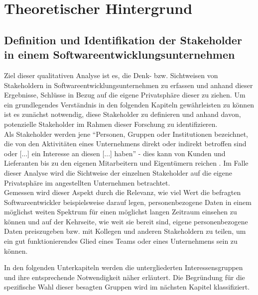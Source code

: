 \chapter{Theoretischer Hintergrund} %
\label{Background} %

\section{Definition und Identifikation der Stakeholder in einem Softwareentwicklungsunternehmen}
Ziel dieser qualitativen Analyse ist es, die Denk- bzw. Sichtweisen von Stakeholdern in Softwareentwicklungsunternehmen zu erfassen und anhand dieser Ergebnisse, Schlüsse in Bezug auf die
eigene Privatsphäre dieser zu ziehen. Um ein grundlegendes Verständnis in den folgenden Kapiteln gewährleisten zu können ist es zunächst notwendig, diese Stakeholder zu definieren und anhand davon, 
potenzielle Stakeholder im Rahmen dieser Forschung zu identifizieren. \\ Als Stakeholder werden jene \enquote{Personen, Gruppen oder Institutionen bezeichnet, die von den Aktivitäten eines Unternehmens 
direkt oder indirekt betroffen sind oder [...] ein Interesse an diesen [...] haben} \cite{Fle:16} - dies kann von Kunden und Lieferanten bis zu den eigenen Mitarbeitern und Eigentümern reichen \cite{Fle:16}. 
Im Falle dieser Analyse wird die Sichtweise der einzelnen Stakeholder auf die eigene Privatsphäre im angestellten Unternehmen betrachtet. \\ Gemessen wird dieser Aspekt durch die Relevanz, wie viel Wert die befragten
Softwareentwickler beispielsweise darauf legen, personenbezogene Daten in einem möglichst weiten Spektrum für einen möglichst langen Zeitraum einsehen zu können und auf der Kehrseite, wie weit sie bereit sind, eigene
personenbezogene Daten preiszugeben bzw. mit Kollegen und anderen Stakeholdern zu teilen, um ein gut funktionierendes Glied eines Teams oder eines Unternehmens sein zu können.

In den folgenden Unterkapiteln werden die untergliederten Interessensgruppen und ihre entsprechende Notwendigkeit näher erläutert. Die Begründung für die spezifische Wahl dieser besagten Gruppen wird im
nächsten Kapitel klassifiziert.

